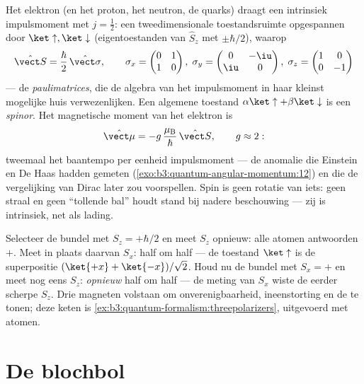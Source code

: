 \begin{definition}\label{def:b3:spin-two-level:spin}
Het elektron (en het proton, het neutron, de quarks) draagt een
intrinsiek impulsmoment met $j = \tfrac12$: een tweedimensionale
toestandsruimte opgespannen door $\ket\uparrow, \ket\downarrow$
(eigentoestanden van $\hat S_z$ met $\pm\hbar/2$), waarop
\[
\hat{\vect S} = \frac\hbar2\,\hat{\vect\sigma} , \qquad
\sigma_x = \begin{pmatrix}0&1\\1&0\end{pmatrix} ,\;
\sigma_y = \begin{pmatrix}0&-\iu\\\iu&0\end{pmatrix} ,\;
\sigma_z = \begin{pmatrix}1&0\\0&-1\end{pmatrix}
\]
--- de \emph{paulimatrices}, die de algebra van het impulsmoment in haar
kleinst mogelijke huis verwezenlijken. Een algemene toestand
$\alpha\ket\uparrow + \beta\ket\downarrow$ is een \emph{spinor}. Het
magnetische moment van het elektron is
\[
\hat{\vect\mu} = -g\,\frac{\mu_{\text{B}}}{\hbar}\,\hat{\vect S} ,
\qquad g \approx 2 :
\]
tweemaal het baantempo per eenheid impulsmoment --- de anomalie die
Einstein en De Haas hadden gemeten
(\cref{exo:b3:quantum-angular-momentum:12}) en die de vergelijking van
Dirac later zou voorspellen. Spin is geen rotatie van iets: geen straal
en geen ``tollende bal'' houdt stand bij nadere beschouwing --- zij is
intrinsiek, net als lading.
\end{definition}

\begin{example}\label{ex:b3:spin-two-level:chained}
Selecteer de bundel met $S_z = +\hbar/2$ en meet $S_z$ opnieuw: alle
atomen antwoorden $+$. Meet in plaats daarvan $S_x$: half om half --- de
toestand $\ket\uparrow$ is de superpositie $(\ket{+x} + \ket{-x})/\sqrt2$.
Houd nu de bundel met $S_x = +$ en meet nog eens $S_z$: \emph{opnieuw}
half om half --- de meting van $S_x$ wiste de eerder scherpe $S_z$. Drie
magneten volstaan om onverenigbaarheid, ineenstorting en de  te tonen; deze keten is
\cref{ex:b3:quantum-formalism:threepolarizers}, uitgevoerd met atomen.
\end{example}

\section{De blochbol}

